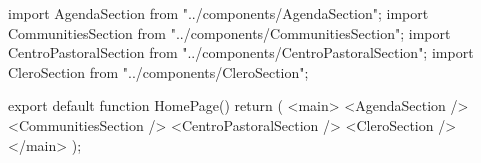 import { AgendaSection } from "../components/AgendaSection";
import { CommunitiesSection } from "../components/CommunitiesSection";
import { CentroPastoralSection } from "../components/CentroPastoralSection";
import { CleroSection } from "../components/CleroSection";

export default function HomePage() {
  return (
    <main>
      <AgendaSection />
      <CommunitiesSection />
      <CentroPastoralSection />
      <CleroSection />
    </main>
  );
}
